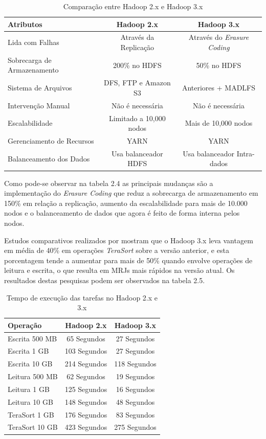 \begin{table}[htbp]
\centering
\caption{Comparação entre Hadoop 2.x e Hadoop 3.x}
\label{Hadoop2andHadoop3}
\begin{tabular}{|l|c|c|} \hline
\textbf{Atributos} & \textbf{Hadoop 2.x} & \textbf{Hadoop 3.x} \\ \hline
Lida com Falhas & Através da Replicação & Através do \emph{Erasure Coding}\\\hline
Sobrecarga de Armazenamento & 200\% no HDFS & 50\% no HDFS\\\hline
Sistema de Arquivos & DFS, FTP e Amazon S3 & Anteriores + MADLFS\\\hline
Intervenção Manual & Não é necessária & Não é necessária\\\hline
Escalabilidade & Limitado a 10,000 nodos & Mais de 10,000 nodos\\\hline
Gerenciamento de Recursos & YARN & YARN\\\hline
Balanceamento dos Dados & Usa balanceador HDFS & Usa balanceador Intra-dados\\
\hline
\end{tabular}
\end{table}



Como pode-se observar na tabela 2.4 as principais mudanças são a implementação do \emph{Erasure Coding} que reduz a sobrecarga de armazenamento em 150\% em relação a replicação, aumento da escalabilidade para mais de 10.000 nodos e o balanceamento de dados que agora é feito de forma interna pelos nodos.

Estudos comparativos realizados por \cite{masur2017preliminary} mostram que o Hadoop 3.x leva vantagem em média de 40\% em operações \emph{TeraSort} sobre a versão anterior, e esta porcentagem tende a aumentar para mais de 50\% quando envolve operações de leitura e escrita, o que resulta em MRJs mais rápidos na versão atual. Os resultados destas pesquisas podem ser observados na tabela 2.5.

\begin{table}[htbp]
\centering
\caption{Tempo de execução das tarefas no Hadoop 2.x e 3.x}
\label{Hadoop2andHadoop3Comparison}
\begin{tabular}{|l|c|c|} \hline
\textbf{Operação} & \textbf{Hadoop 2.x} & \textbf{Hadoop 3.x} \\ \hline
Escrita 500 MB & 65 Segundos & 27 Segundos\\\hline
Escrita 1 GB & 103 Segundos & 27 Segundos\\\hline
Escrita 10 GB & 214 Segundos & 118 Segundos\\\hline
Leitura 500 MB & 62 Segundos & 19 Segundos\\\hline
Leitura 1 GB & 125 Segundos & 16 Segundos\\\hline
Leitura 10 GB & 148 Segundos & 48 Segundos\\\hline
TeraSort 1 GB & 176 Segundos & 83 Segundos\\\hline
TeraSort 10 GB & 423 Segundos & 275 Segundos\\
\hline
\end{tabular}
\end{table}

